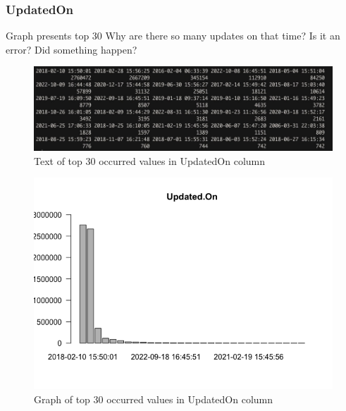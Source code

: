 \newpage
\subsubsection{UpdatedOn}
Graph presents top 30
Why are there so many updates on that time? Is it an error? Did something happen?
\begin{figure}[H]
\includegraphics[scale=0.45]{images/EDA/UpdatedOn.jpg}
\centering
\caption{Text of top 30 occurred values in UpdatedOn column}
\end{figure}
\begin{figure}[H]
\includegraphics[scale=0.7]{images/EDA/UpdatedOn.png}
\centering
\caption{Graph of top 30 occurred values in UpdatedOn column}
\end{figure}
